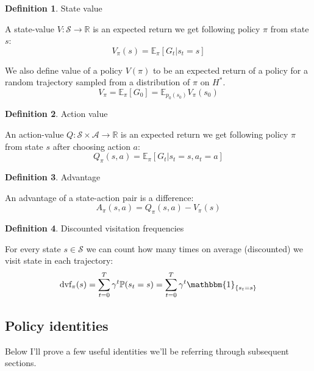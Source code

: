 \documentclass[10pt]{article}
\numberwithin{equation}{subsection}
\newcommand{\MS}{\ensuremath{\mathcal{S}}}
\newcommand{\MA}{\ensuremath{\mathcal{A}}}
\newcommand{\Mpz}{\ensuremath{p_0}}
\newcommand{\R}{\ensuremath{\mathbb{R}}}
\newcommand{\E}{\ensuremath{\mathbb{E}}}
\newcommand{\PR}{\ensuremath{\mathbb{P}}}
\newcommand{\ONE}{\ensuremath{\mathbbm{1}}}
\newcommand{\ra}{\ensuremath{\rightarrow}}
\newcommand{\mpi}{\ensuremath{\pi}\xspace}
\newcommand{\dvf}{\ensuremath{\textrm{dvf}}}
\theoremstyle{plain}
\theoremstyle{definition}
\newtheorem{definition}{Definition}[subsection]
\begin{document}
\begin{definition}{State value}

A state-value $V: \MS \ra \R$ is an expected return we get following policy \mpi from state $s$:
$$
V_\mpi(s) = \E_\mpi \left[ G_t | s_t = s \right] 
$$

We also define value of a policy $V(\mpi)$ to be an expected return of a policy for a 
random trajectory sampled from a distribution of \mpi on $H^*$.
$$
V_\mpi = \E_{\mpi} \left[ G_0 \right] = \E_{\Mpz(s_0)} V_\mpi(s_0)
$$
\end{definition}

\begin{definition}{Action value}

An action-value $Q : \MS \times \MA \ra \R$ is an expected return we get following policy \mpi
from state $s$ after choosing action $a$:
$$
Q_\mpi(s, a) = \E_\mpi \left[ G_t | s_t = s, a_t = a \right]
$$
\end{definition}

\begin{definition}{Advantage}

An advantage of a state-action pair is a difference:
$$
A_\mpi(s, a) = Q_\mpi(s, a) - V_\mpi(s)
$$
\end{definition}

\begin{definition}{Discounted visitation frequencies}

For every state $s \in \MS$ we can count how many times on average (discounted) we visit 
state in each trajectory:
$$
\dvf_\mpi(s) = \sum_{t=0}^T \gamma^t \PR(s_t = s) = \sum_{t=0}^T \gamma^t \ONE_{\{s_t = s\}}
$$
\end{definition}

\subsection{Policy identities}

Below I'll prove a few useful identities we'll be referring through subsequent sections.
\end{document}
